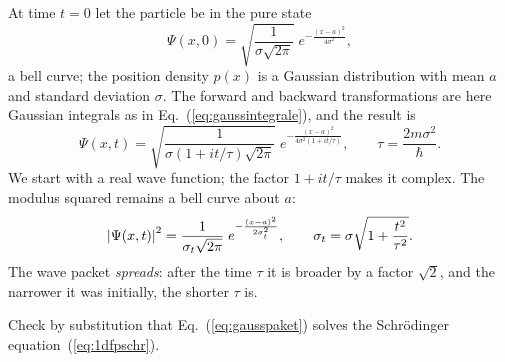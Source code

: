 
\begin{example}
	At time $t=0$ let the particle be in the pure state
	\begin{equation}
		\Psi(x,0) = \sqrt{\frac{1}{\sigma\sqrt{2\pi}}}\;e^{-\frac{(x-a)^2}{4\sigma^2}},
	\end{equation}
	a bell curve; the position density $p(x)$ is a Gaussian distribution with mean $a$ and standard deviation $\sigma$. The forward and backward transformations are here Gaussian integrals as in Eq.~(\ref{eq:gaussintegrale}), and the result is
	\begin{equation}\label{eq:gausspaket}
		\Psi(x,t) = \sqrt{\frac{1}{\sigma\left(1+it/\tau\right)\sqrt{2\pi}}}\;e^{-\frac{(x-a)^2}{4\sigma^2\left(1+it/\tau\right)}}, \qquad \tau = \frac{2m\sigma^2}{\hbar}.
	\end{equation}
	We start with a real wave function; the factor $1+it/\tau$ makes it complex. The modulus squared remains a bell curve about $a$:
	\begin{equation}
		\left\lvert \Psi(x,t) \right\rvert^2 = \frac{1}{\sigma_t\sqrt{2\pi}}\;e^{-\frac{(x-a)^2}{2\sigma_t^2}}, \qquad \sigma_t = \sigma\sqrt{1+\frac{t^2}{\tau^2}}.
	\end{equation}
	The wave packet \emph{spreads}: after the time $\tau$ it is broader by a factor $\sqrt2$, and the narrower it was initially, the shorter $\tau$ is.
\end{example}

\begin{exercise}
	Check by substitution that Eq.~(\ref{eq:gausspaket}) solves the Schrödinger equation~(\ref{eq:1dfpschr}).
\end{exercise}

